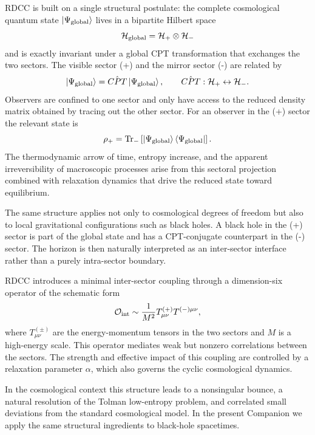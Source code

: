 \documentclass[11pt,a4paper]{article}
\begin{document}
RDCC is built on a single structural postulate: the complete cosmological quantum state \(\ket{\Psi_{\rm global}}\) lives in a bipartite Hilbert space
\begin{equation}
\mathcal{H}_{\rm global} = \mathcal{H}_{+} \otimes \mathcal{H}_{-}
\end{equation}
and is exactly invariant under a global CPT transformation that exchanges the two sectors. The visible sector (+) and the mirror sector (-) are related by
\begin{equation}
\ket{\Psi_{\rm global}} = \hat{CPT} \ket{\Psi_{\rm global}}, \qquad \hat{CPT}: \mathcal{H}_{+} \leftrightarrow \mathcal{H}_{-}.
\end{equation}
Observers are confined to one sector and only have access to the reduced density matrix obtained by tracing out the other sector. For an observer in the (+) sector the relevant state is
\begin{equation}
\rho_{+} = \mathrm{Tr}_{-} \left[ \ket{\Psi_{\rm global}}\bra{\Psi_{\rm global}} \right].
\end{equation}
The thermodynamic arrow of time, entropy increase, and the apparent irreversibility of macroscopic processes arise from this sectoral projection combined with relaxation dynamics that drive the reduced state toward equilibrium.

The same structure applies not only to cosmological degrees of freedom but also to local gravitational configurations such as black holes. A black hole in the (+) sector is part of the global state and has a CPT-conjugate counterpart in the (-) sector. The horizon is then naturally interpreted as an inter-sector interface rather than a purely intra-sector boundary.

RDCC introduces a minimal inter-sector coupling through a dimension-six operator of the schematic form
\begin{equation}
\mathcal{O}_{\rm int} \sim \frac{1}{M^{2}} T^{(+)}_{\mu\nu} T^{(-)\mu\nu},
\end{equation}
where \(T^{(\pm)}_{\mu\nu}\) are the energy-momentum tensors in the two sectors and \(M\) is a high-energy scale. This operator mediates weak but nonzero correlations between the sectors. The strength and effective impact of this coupling are controlled by a relaxation parameter \(\alpha\), which also governs the cyclic cosmological dynamics.

In the cosmological context this structure leads to a nonsingular bounce, a natural resolution of the Tolman low-entropy problem, and correlated small deviations from the standard cosmological model. In the present Companion we apply the same structural ingredients to black-hole spacetimes.
\end{document}
